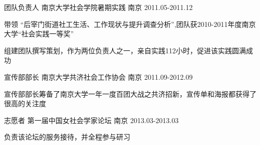 \begin{cventries}

      
      

        
   \cventry
    {团队负责人}
    {南京大学社会学院暑期实践}
    {南京}
    {2011.05-2011.12}
    {
      \begin{cvitems}           
        \item{带领 “后宰门街道社工生活、工作现状与提升调查分析”,团队获2010-2011年度南京大学“社会实践一等奖”}
        \item{组建团队撰写策划，作为两位负责人之一，亲自实践112小时，促进该实践圆满成功}
		\end{cvitems}
     }	
     
	    \cventry
    {宣传部部长}
    {南京大学共济社会工作协会}
    {南京}
    {2011.09-2012.09}
    {
      \begin{cvitems}           
        \item{宣传部部长筹备了南京大学一年一度百团大战之共济招新，宣传单和海报都获得了很高的关注度}	
		\end{cvitems}
      }
	 
	   \cventry
    {志愿者}
    {第一届中国女社会学家论坛}
    {南京}
    {2013.03-2013.03}
    {
      \begin{cvitems}           
        \item{ 负责该论坛的服务接待，并全程参与研习}	
       \end{cvitems}
      }

        
\end{cventries}

